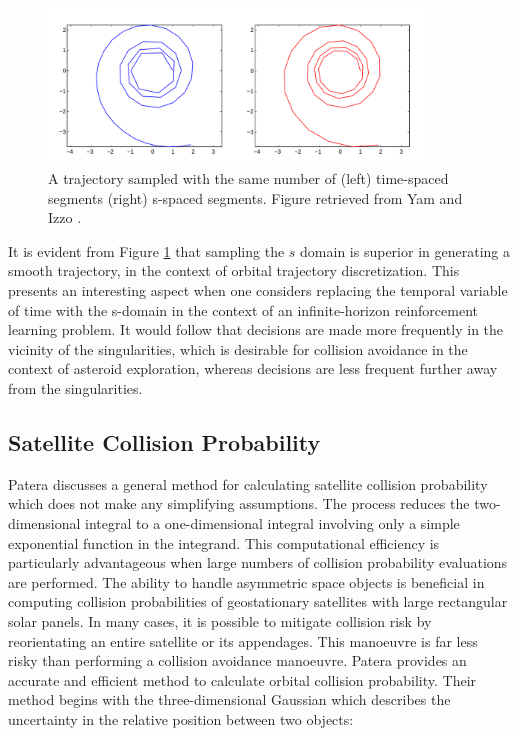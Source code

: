 \begin{figure}[H]
    \centering
    \captionsetup{format=hang} %
    \includegraphics[width=0.9\textwidth]{graphics/sims2.png}
    \caption{
        A trajectory sampled with the same number of (left) time-spaced segments (right) s-spaced segments. Figure retrieved from Yam and Izzo \cite{Yam2010}.
    }
    \label{fig:sundmann_sampling}
\end{figure}

It is evident from Figure \ref{fig:sundmann_sampling} that sampling the $s$ domain is superior in generating a smooth trajectory, in the context of orbital trajectory discretization. This presents an interesting aspect when one considers replacing the temporal variable of time with the s-domain in the context of an infinite-horizon reinforcement learning problem. It would follow that decisions are made more frequently in the vicinity of the singularities, which is desirable for collision avoidance in the context of asteroid exploration, whereas decisions are less frequent further away from the singularities.

\subsection{Satellite Collision Probability}\label{ssec:collision_probability}

Patera \cite{Patera2001} discusses a general method for calculating satellite collision probability which does not make any simplifying assumptions. The process reduces the two-dimensional integral to a one-dimensional integral involving only a simple exponential function in the integrand. This computational efficiency is particularly advantageous when large numbers of collision probability evaluations are performed. The ability to handle asymmetric space objects is beneficial in computing collision probabilities of geostationary satellites with large rectangular solar panels. In many cases, it is possible to mitigate collision risk by reorientating an entire satellite or its appendages. This manoeuvre is far less risky than performing a collision avoidance manoeuvre. Patera provides an accurate and efficient method to calculate orbital collision probability. Their method begins with the three-dimensional Gaussian which describes the uncertainty in the relative position between two objects:

